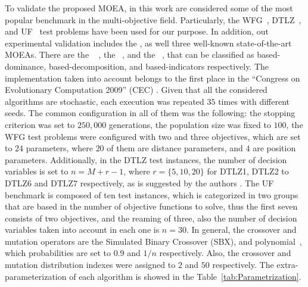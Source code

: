 %
To validate the proposed MOEA, in this work are considered some of the most popular benchmark in the multi-objective field.
%
Particularly, the WFG~\cite{Joel:WFG}, DTLZ~\cite{Joel:DTLZ}, and UF~\cite{Joel:CEC2009} test problems have been used for our purpose. 
%
%
In addition, out experimental validation includes the \VSDMOEA{}, as well three well-known state-of-the-art MOEAs.
%
There are the \NSGAII{}~\cite{Joel:jMetal} , the \MOEAD{}~\cite{MOEADCode}, and the \RMOEA{}~\cite{R2EMOACode}, that can be classified as based-dominance, based-decomposition, and based-indicators respectively.
%
The \MOEAD{} implementation taken into account belongs to the first place in the ``Congress on Evolutionary Computation 2009'' (CEC) \cite{zhang2009performance}.
%
Given that all the considered algorithms are stochastic, each execution was repeated $35$ times with different seeds.
%
The common configuration in all of them was the following: the stopping criterion was set to $250,000$ generations, the population size was fixed to $100$, the WFG test problems were configured with two and three objectives, which are set to $24$ parameters, where $20$ of them are distance parameters, and $4$ are position parameters.
%
Additionally, in the DTLZ test instances, the number of decision variables is set to $n=M+r-1$, where $r=\{5, 10, 20\}$ for DTLZ1, DTLZ2 to DTLZ6 and DTLZ7 respectively, as is suggested by the authors \cite{Joel:DTLZ}.  
% 
The UF benchmark is composed of ten test instances, which is categorized in two groups that are based in the number of objective functions to solve, thus the first seven consists of two objectives, and the reaming of three, also the number of decision variables taken into account in each one is $n=30$.
%
In general, the crossover and mutation operators are the Simulated Binary Crossover (SBX), and polynomial~\cite{Joel:SBX1994, Joel:Mutation}, which probabilities are set to $0.9$ and $1/n$ respectively.
%
Also, the crossover and mutation distribution indexes were assigned to $2$ and $50$ respectively.
%
The extra-parameterization of each algorithm is showed in the Table~\ref{tab:Parametrization}.
%

